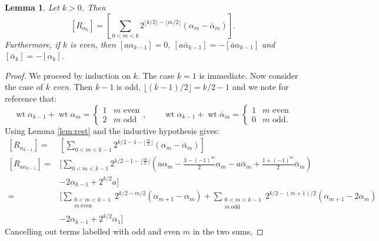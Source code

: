 \documentclass{article}
\DeclareMathOperator{\wt}{\mathrm{wt}}
\newtheorem{lem}{Lemma}
\theoremstyle{definition}
\begin{document}
\begin{lem}\label{lem:expl}
        Let $k>0$.
        Then
                $$[R_{\alpha_k}] = [ \sum_{0<m<k} 2^{\lfloor k/2\rfloor - \lfloor m/2\rfloor} (\alpha_m
                        - \bar\alpha_m) ].$$
        Furthermore, if $k$ is even, then
        $[a\alpha_{k-1}]=0$,
        $[a\bar\alpha_{k-1}]=-[\bar a\alpha_{k-1}]$
        and $[\bar\alpha_k] = -[\alpha_k]$.
\end{lem}
\begin{proof}
        We proceed by induction on $k$.
        The case $k=1$ is immediate.
        Now consider the case of $k$ \emph{even}.
        Then $k-1$ is odd, $\lfloor (k-1)/2\rfloor = k/2-1$
        and we note for reference that:
        $$\wt\alpha_{k-1} + \wt\alpha_m =\begin{cases} 1 & \textrm{$m$ even} \\ 2 & \textrm{$m$ odd} \end{cases},
                \qquad
        \wt\alpha_{k-1} + \wt\bar\alpha_m =\begin{cases} 1 & \textrm{$m$ even} \\ 0 & \textrm{$m$ odd.} \end{cases}$$
        Using Lemma \ref{lem:rest} and the inductive hypothesis gives:
        $$\begin{aligned}{}
                [R_{\alpha_{k-1}}] =& [ \sum_{0 < m < k-1} 
                2^{k/2-1
                - \lfloor \frac{m}{2}\rfloor} 
                (\alpha_m - \bar\alpha_m) ]
                \\{}
                [R_{a\alpha_{k-1}}]=& [ \sum_{0 < m < k-1}
                2^{k/2-1
                - \lfloor \frac{m}{2}\rfloor} 
                \left( a \alpha_m - \frac{3  - (-1)^m}{2} \alpha_m 
                - a \bar\alpha_m + \frac{1 + (-1)^m}{2} \bar\alpha_m \right) 
                \\ & -2\alpha_{k-1} + 2^{k/2}a
                ]
                \\{}
                =& [\sum_{\substack{0<m<k-1\\m\ \textrm{even}}} 2^{k/2-m/2} (\alpha_{m+1} - \alpha_m)
                + \sum_{\substack{0<m<k-1\\m\ \textrm{odd}}} 2^{k/2-(m+1)/2} (\alpha_{m+1} -2\alpha_m )
                \\ & - 2\alpha_{k-1} + 2^{k/2}\alpha_1
                ]
        \end{aligned}$$
        Cancelling out terms labelled with odd and even $m$ in the two sums,

\end{proof}
\end{document}
